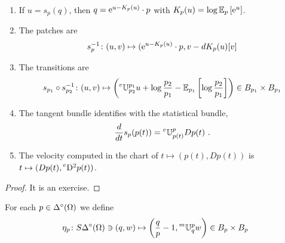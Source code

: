 \documentclass[12pt,a4paper]{amsart}
\begin{document}
\begin{proposition} \ 
  \begin{enumerate}
  \item If $u = s_p(q)$, then $q = \mathrm{e}^{u-K_p(u)}\cdot p$ with $K_p(u) = \log{\operatorname{\mathbb E}}_{p}\left[\mathrm{e}^u\right]$.
  \item The patches are
    \begin{equation*}
      s_p^{-1} \colon (u,v) \mapsto (\mathrm{e}^{u-K_p(u)}\cdot p, v - dK_p(u)[v]
    \end{equation*}
  \item The transitions are
    \begin{equation*}
      s_{p_1} \circ s_{p_2}^{-1} \colon (u,v) \mapsto \left(\prescript{e}{}{\mathbb U}_{p_2}^{p_1} u + \log\frac{p_2}{p_1} - {\operatorname{\mathbb E}}_{p_1}\left[\log\frac{p_2}{p_1}\right]\right) \in B_{p_1} \times B_{p_1}
    \end{equation*}
  \item The tangent bundle identifies with the statistical bundle, 
%
    \begin{equation*}
      \frac{d}{dt} s_p(p(t)) = \prescript{e}{}{\mathbb U}_{p(t)}^{p} Dp(t) \ .
    \end{equation*}
\item The velocity computed in the chart of $t \mapsto (p(t),Dp(t))$ is $t \mapsto (Dp(t),\eacc p(t))$.  
\end{enumerate}
  \end{proposition}

  \begin{proof}
    It is an exercise.
  \end{proof}

\begin{definition}
For each $p \in \Delta^\circ(\Omega)$ we define
\begin{equation*}
\eta_p \colon S\Delta^\circ(\Omega) \ni (q,w) \mapsto \left(\frac q p - 1, \prescript{m}{}{\mathbb U}_{q}^{p} w\right) \in B_p \times B_p   
\end{equation*}
\end{definition}
\end{document}
